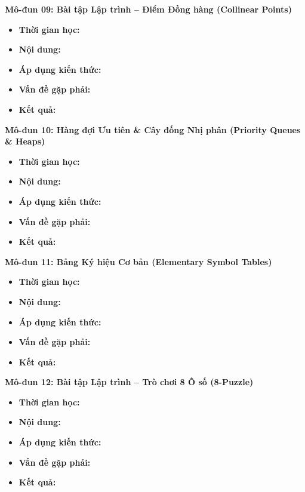 \documentclass[11pt, a4paper]{article}
\begin{document}
\vspace{0.15cm}

\noindent\textbf{Mô-đun 09: Bài tập Lập trình -- Điểm Đồng hàng (Collinear Points)}
\begin{itemize}
    \item \textbf{Thời gian học:} 
    \item \textbf{Nội dung:} 
    \item \textbf{Áp dụng kiến thức:} 
    \item \textbf{Vấn đề gặp phải:} 
    \item \textbf{Kết quả:} 
\end{itemize}

\vspace{0.15cm}

\noindent\textbf{Mô-đun 10: Hàng đợi Ưu tiên \& Cây đống Nhị phân (Priority Queues \& Heaps)}
\begin{itemize}
    \item \textbf{Thời gian học:} 
    \item \textbf{Nội dung:} 
    \item \textbf{Áp dụng kiến thức:} 
    \item \textbf{Vấn đề gặp phải:} 
    \item \textbf{Kết quả:} 
\end{itemize}

\vspace{0.15cm}

\noindent\textbf{Mô-đun 11: Bảng Ký hiệu Cơ bản (Elementary Symbol Tables)}
\begin{itemize}
    \item \textbf{Thời gian học:} 
    \item \textbf{Nội dung:} 
    \item \textbf{Áp dụng kiến thức:} 
    \item \textbf{Vấn đề gặp phải:} 
    \item \textbf{Kết quả:} 
\end{itemize}

\vspace{0.15cm}

\noindent\textbf{Mô-đun 12: Bài tập Lập trình -- Trò chơi 8 Ô số (8-Puzzle)}
\begin{itemize}
    \item \textbf{Thời gian học:} 
    \item \textbf{Nội dung:} 
    \item \textbf{Áp dụng kiến thức:} 
    \item \textbf{Vấn đề gặp phải:} 
    \item \textbf{Kết quả:} 
\end{itemize}
\end{document}
